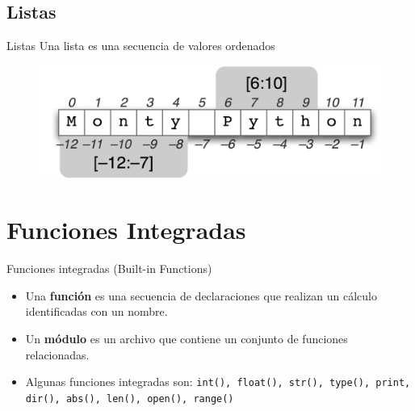 \documentclass[11pt]{beamer}
\begin{document}
\subsection{Listas}
\begin{frame}{Listas}
Una lista es una secuencia de valores ordenados
\begin{figure}
\includegraphics[scale=0.5]{lista.png}
\end{figure}
\end{frame}


\section{Funciones Integradas}

\begin{frame}{Funciones integradas (Built-in Functions)}
\begin{itemize}
\item Una {\bf función} es una secuencia de declaraciones que realizan un cálculo identificadas con un nombre.\\
\item Un {\bf módulo } es un archivo que contiene un conjunto de funciones relacionadas.
\item Algunas funciones integradas son: {\tt int(), float(), str(), type(), print, dir(), abs(), len(), open(), range()}
\end{itemize}
\end{frame}
\end{document}
